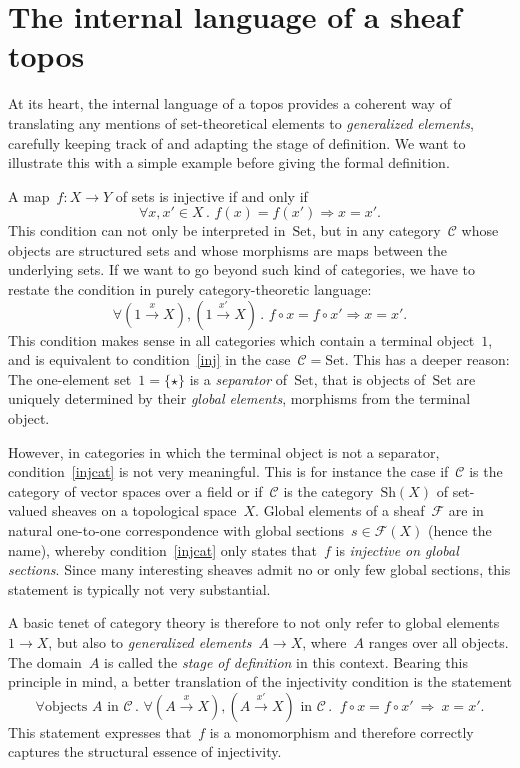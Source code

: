 \documentclass[10pt,reqno,a4paper]{amsbook}
\theoremstyle{definition}
\theoremstyle{plain}
\theoremstyle{remark}
\renewcommand{\C}{\mathcal{C}}
\newcommand{\F}{\mathcal{F}}
\newcommand{\Set}{\mathrm{Set}}
\newcommand{\Sh}{\mathrm{Sh}}
\newcommand{\?}{\,{:}\,}
\renewcommand{\_}{\mathpunct{.}\,}
\newcommand{\xra}{\xrightarrow}
\begin{document}
\section{The internal language of a sheaf topos}\label{sect:internal-language}

At its heart, the internal language of a topos provides a coherent way of
translating any mentions of set-theoretical elements to
\emph{generalized elements}, carefully keeping track of and adapting
the stage of definition. We want to illustrate this with a simple example
before giving the formal definition.

A map~$f : X \to Y$ of sets is injective if and only if
\begin{equation}\label{inj}
  \forall x,x' \in X\_ f(x) = f(x') \Longrightarrow x = x'.
\end{equation}
This condition can not only be interpreted in~$\Set$, but in any category~$\C$ whose
objects are structured sets and whose morphisms are maps between the underlying
sets. If we want to go beyond such kind of categories, we have to restate the
condition in purely category-theoretic language:
\begin{equation}\label{injcat}
  \forall (1 \xra{x} X), (1 \xra{x'} X)\_ f \circ x = f \circ x'
  \Longrightarrow x = x'.
\end{equation}
This condition makes sense in all categories which contain a terminal
object~$1$, and is equivalent to condition~\eqref{inj} in the case~$\C = \Set$.
This has a deeper reason: The one-element set~$1 = \{ \star \}$ is a
\emph{separator} of~$\Set$, that is objects of~$\Set$ are uniquely determined
by their \emph{global elements}, morphisms from the terminal object.

However, in categories in which the terminal object is not a separator,
condition~\eqref{injcat} is not very meaningful. This is for instance the case
if~$\C$ is the category of vector spaces over a field or if~$\C$ is the category~$\Sh(X)$ of set-valued sheaves on a topological
space~$X$. Global elements of a sheaf~$\F$ are in natural one-to-one
correspondence with global sections~$s \in \F(X)$ (hence the name), whereby
condition~\eqref{injcat} only states that~$f$ is \emph{injective on global
sections}. Since many interesting sheaves admit no or only few global sections,
this statement is typically not very substantial.

A basic tenet of category theory is therefore to not only refer to global
elements~$1 \to X$, but also to \emph{generalized elements}~$A \to X$,
where~$A$ ranges over all objects. The domain~$A$ is called the \emph{stage of
definition} in this context. Bearing this principle in mind, a better
translation of the injectivity condition is the statement
\begin{equation}\label{injgen}
  \forall \text{objects $A$ in~$\C$}\_ \forall (A \xra{x} X), (A \xra{x'\!} X) \text{ in~$\C$}\_\
  f \circ x = f \circ x' \ \Longrightarrow\ x = x'.
\end{equation}
This statement expresses that~$f$ is a monomorphism and therefore
correctly captures the structural essence of injectivity.
\end{document}
